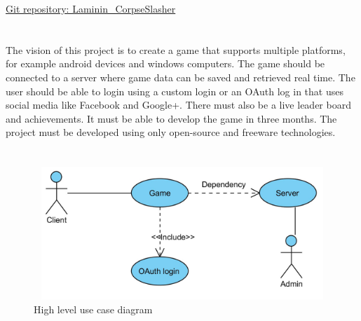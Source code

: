 \documentclass[letterpaper]{article}
\begin{document}
	\newpage
		\renewcommand\contentsname{TABLE OF CONTENTS}
		\newcommand\contentsnameLC{\colorbox{black}{\makebox[\textwidth-2\fboxsep][l]{\bfseries\color{red} Table of Contents}}}
		
		\renewcommand{\cftdot}{}
		\hypersetup{linktocpage}
		\tableofcontents
		
		\begin{flushleft}
			\LARGE\href{https://github.com/njTaljaard/Laminin_CorpseSlasher/}{Git repository: Laminin\_CorpseSlasher}
		\end{flushleft}
		
	\newpage
	
		\section*{\colorbox{black}{}} 
		\vspace{0.2in}
		
		The vision of this project is to create a game that supports multiple platforms, for example android devices and windows computers. The game should be connected to a server where game data can be saved and retrieved real time. The user should be able to login using a custom login or an OAuth log in that uses social media like Facebook and Google+. There must also be a live leader board and achievements. It must be able to develop the game in three months. The project must be developed using only open-source and freeware technologies.
					
		\section*{\colorbox{black}{}} 
		
		\vspace{0.2in}
		
		\begin{figure}[ht!]
		\centering
		\includegraphics[width=180mm, height=50mm]{UML_Diagram/Use_Case/High_Level}
		\caption{High level use case diagram}
		\label{overflow}
		\end{figure}
		
\end{document}
